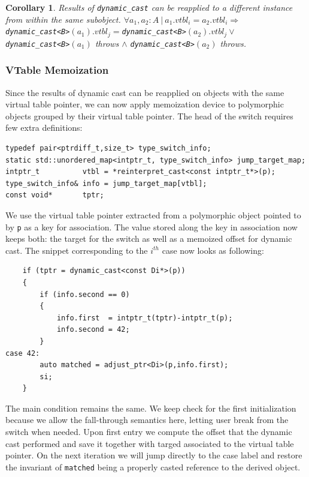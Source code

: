 \documentclass[preprint]{sigplanconf}
\makeatletter
\DeclareRobustCommand{\code}[1]{{\lstinline[breaklines=false,escapechar=@]{#1}}}
\newtheorem{corollary}{Corollary}
\makeatother
\begin{document}
\begin{corollary}
Results of \code{dynamic_cast} can be reapplied to a different instance from within the same subobject.
$\forall a_1, a_2 : A\ |\ a_1.vtbl_i = a_2.vtbl_i \Rightarrow$
\code{dynamic_cast<B>}$(a_1).vtbl_j = $\code{dynamic_cast<B>}$(a_2).vtbl_j \vee$ \\
\code{dynamic_cast<B>}$(a_1)$ throws $\wedge$ \code{dynamic_cast<B>}$(a_2)$ 
throws.
\label{crl:vtbl}
\end{corollary}

\subsubsection{VTable Memoization}
\label{sec:vtblmem}

Since the results of dynamic cast can be reapplied on objects with the same 
virtual table pointer, we can now apply memoization device to polymorphic 
objects grouped by their virtual table pointer. The head of the switch requires 
few extra definitions:

\begin{lstlisting}
typedef pair<ptrdiff_t,size_t> type_switch_info;
static std::unordered_map<intptr_t, type_switch_info> jump_target_map;
intptr_t          vtbl = *reinterpret_cast<const intptr_t*>(p);
type_switch_info& info = jump_target_map[vtbl];
const void*       tptr; 
\end{lstlisting}

We use the virtual table pointer extracted from a polymorphic object pointed to 
by \code{p} as a key for association. The value stored along the key in 
association now keeps both: the target for the switch as well as a memoized 
offset for dynamic cast. The snippet corresponding to the $i^{th}$ case now 
looks as following:

\begin{lstlisting}
    if (tptr = dynamic_cast<const Di*>(p))
    {
        if (info.second == 0)
        {
            info.first  = intptr_t(tptr)-intptr_t(p);
            info.second = 42;
        }
case 42:
        auto matched = adjust_ptr<Di>(p,info.first); 
        si;
    }
\end{lstlisting}

\noindent
The main condition remains the same. We keep check for the first initialization 
because we allow the fall-through semantics here, letting user break from the 
switch when needed. Upon first entry we compute the offset that the dynamic cast 
performed and save it together with targed associated to the virtual table 
pointer. On the next iteration we will jump directly to the case label and 
restore the invariant of \code{matched} being a properly casted reference to the 
derived object.
\end{document}
